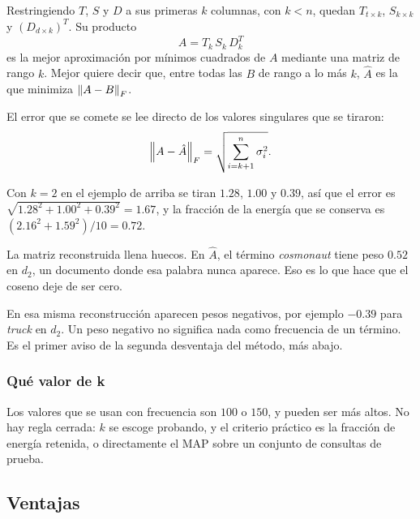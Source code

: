\documentclass[11pt,letterpaper]{article}
\begin{document}
Restringiendo $T$, $S$ y $D$ a sus primeras $k$ columnas, con $k < n$,
quedan $T_{t \times k}$, $S_{k \times k}$ y $(D_{d \times k})^{T}$. Su
producto
\[
    \hat{A} = T_k\, S_k\, D_k^{T}
\]
es la mejor aproximación por mínimos cuadrados de $A$ mediante una
matriz de rango $k$. Mejor quiere decir que, entre todas las $B$ de
rango a lo más $k$, $\hat{A}$ es la que minimiza $\left\lVert A - B \right\rVert_F$.

El error que se comete se lee directo de los valores singulares que se
tiraron:
\[
    \left\lVert A - \hat{A} \right\rVert_F = \sqrt{\sum_{i=k+1}^{n} \sigma_i^2} .
\]

\begin{ejemplo}
    Con $k = 2$ en el ejemplo de arriba se tiran $1.28$, $1.00$ y
    $0.39$, así que el error es
    $\sqrt{1.28^2 + 1.00^2 + 0.39^2} = 1.67$, y la fracción de la
    energía que se conserva es
    $(2.16^2 + 1.59^2)/10 = 0.72$.

    La matriz reconstruida llena huecos. En $\hat{A}$, el término
    \textit{cosmonaut} tiene peso $0.52$ en $d_2$, un documento donde
    esa palabra nunca aparece. Eso es lo que hace que el coseno deje
    de ser cero.
\end{ejemplo}

\begin{ojo}
    En esa misma reconstrucción aparecen pesos negativos, por ejemplo
    $-0.39$ para \textit{truck} en $d_2$. Un peso negativo no
    significa nada como frecuencia de un término. Es el primer aviso
    de la segunda desventaja del método, más abajo.
\end{ojo}

\subsubsection*{Qué valor de k}

Los valores que se usan con frecuencia son $100$ o $150$, y pueden ser
más altos. No hay regla cerrada: $k$ se escoge probando, y el criterio
práctico es la fracción de energía retenida, o directamente el MAP
sobre un conjunto de consultas de prueba.

\subsection*{Ventajas}
\end{document}
